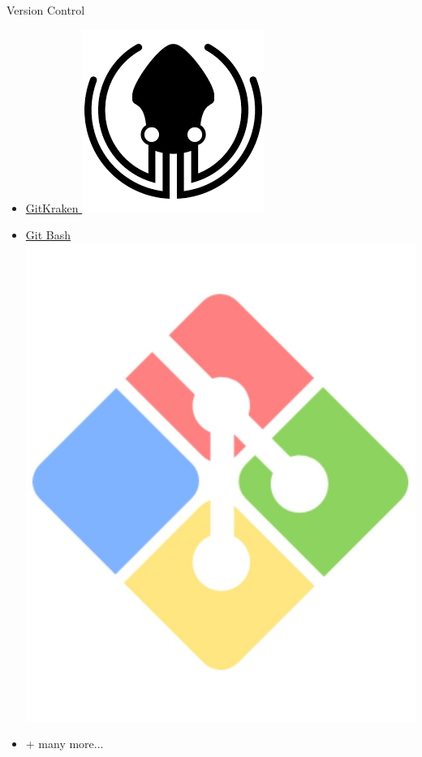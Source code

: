 \documentclass{beamer} %
\begin{document}
\begin{frame}{Version Control}
\begin{itemize}
      \item \href{https://www.gitkraken.com/}{GitKraken \includegraphics[height=.05\textheight]{gitkraken}}
      \item \href{https://gitforwindows.org/}{Git Bash \includegraphics[height=.07\textheight]{gitbash}}
      \item + many more...
    \end{itemize}

  \end{frame}
\end{document}
